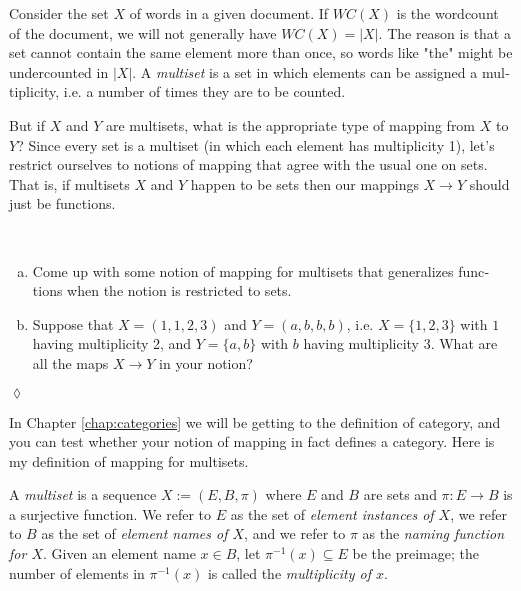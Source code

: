 \documentclass{book}
\def\to{\rightarrow}
\def\taking{\colon}
\def\ss{\subseteq}
\def\m1{{-1}}
\theoremstyle{theoremENG}
\theoremstyle{lemmaENG}
\theoremstyle{propositionENG}
\theoremstyle{corollaryENG}
\theoremstyle{factENG}
\theoremstyle{remarkENG}
\theoremstyle{exampleENG}
\theoremstyle{warningENG}
\theoremstyle{questionENG}
\theoremstyle{guessENG}
\theoremstyle{answerENG}
\theoremstyle{constructionENG}
\theoremstyle{rulesENG}
\theoremstyle{excENG}
\newtheorem{excENG}[subsubsection]{\begin{english}Exercise\end{english}}
\theoremstyle{appENG}
\theoremstyle{definitionENG}
\newtheorem{definitionENG}[subsubsection]{\begin{english}Definition\end{english}}
\theoremstyle{notationENG}
\theoremstyle{conjectureENG}
\theoremstyle{postulateENG}
\newenvironment{exerciseENG}{\begin{excENG}}{\hspace*{\fill}$\lozenge$\end{excENG}}
\theoremstyle{theoremRUS}
\theoremstyle{lemmaRUS}
\theoremstyle{propositionRUS}
\theoremstyle{corollaryRUS}
\theoremstyle{factRUS}
\theoremstyle{remarkRUS}
\theoremstyle{exampleRUS}
\theoremstyle{warningRUS}
\theoremstyle{questionRUS}
\theoremstyle{guessRUS}
\theoremstyle{answerRUS}
\theoremstyle{constructionRUS}
\theoremstyle{rulesRUS}
\theoremstyle{excRUS}
\theoremstyle{appRUS}
\theoremstyle{definitionRUS}
\theoremstyle{notationRUS}
\theoremstyle{conjectureRUS}
\theoremstyle{postulateRUS}
\def\sexc{\begin{enumerate}[a.)]\setlength{\itemsep}{.1cm}\setlength{\parskip}{.1cm}\item}
\def\next{\item}
\def\endsexc{\end{enumerate}}
\begin{document}
\begin{english}
Consider the set $X$ of words in a given document. If $WC(X)$ is the wordcount of the document, we will not generally have $WC(X)=|X|$. The reason is that a set cannot contain the same element more than once, so words like "the" might be undercounted in $|X|$. A {\em multiset} is a set in which elements can be assigned a multiplicity, i.e. a number of times they are to be counted. 

\begin{russian} \end{russian}

But if $X$ and $Y$ are multisets, what is the appropriate type of mapping from $X$ to $Y$? Since every set is a multiset (in which each element has multiplicity 1), let's restrict ourselves to notions of mapping that agree with the usual one on sets. That is, if multisets $X$ and $Y$ happen to be sets then our mappings $X\to Y$ should just be functions.

\begin{russian} \end{russian}

\begin{exerciseENG}\label{exc:multiset 1}~

\sexc Come up with some notion of mapping for multisets that generalizes functions when the notion is restricted to sets. 
\next Suppose that $X=(1,1,2,3)$ and $Y=(a,b,b,b)$, i.e. $X=\{1,2,3\}$ with $1$ having multiplicity 2, and $Y=\{a,b\}$ with $b$ having multiplicity 3. What are all the maps $X\to Y$ in your notion?
\endsexc

\begin{russian} \end{russian}

\end{exerciseENG}

In Chapter \ref{chap:categories} we will be getting to the definition of category, and you can test whether your notion of mapping in fact defines a category. Here is my definition of mapping for multisets.

\begin{russian} \end{russian}

\begin{definitionENG}\label{def:multiset}

A {\em multiset} is a sequence $X:=(E,B,\pi)$ where $E$ and $B$ are sets and $\pi\taking E\to B$ is a surjective function. We refer to $E$ as the set of {\em element instances of $X$}, we refer to $B$ as the set of {\em element names of $X$}, and we refer to $\pi$ as the {\em naming function for $X$}. Given an element name $x\in B$, let $\pi^\m1(x)\ss E$ be the preimage; the number of elements in $\pi^\m1(x)$ is called the {\em multiplicity of $x$}.


\end{definitionENG}
\end{english}
\end{document}
